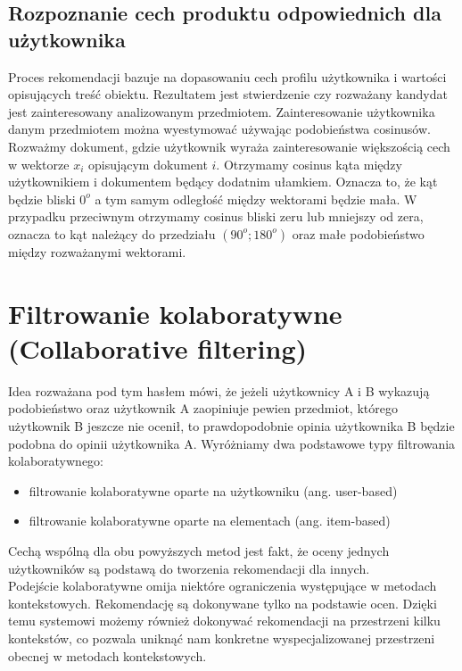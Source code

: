 \documentclass[12pt,a4paper]{report}
\begin{document}
\subsection{Rozpoznanie cech produktu odpowiednich dla użytkownika} 
Proces rekomendacji bazuje na dopasowaniu cech profilu użytkownika i wartości opisujących treść obiektu. Rezultatem jest stwierdzenie czy rozważany kandydat jest zainteresowany analizowanym przedmiotem. Zainteresowanie użytkownika danym przedmiotem można wyestymować używając podobieństwa cosinusów. Rozważmy dokument, gdzie użytkownik wyraża zainteresowanie większością cech w wektorze $x_i$ opisującym dokument $i$. Otrzymamy cosinus kąta między użytkownikiem i dokumentem będący dodatnim ułamkiem. Oznacza to, że kąt będzie bliski $0^{o}$ a tym samym odległość między wektorami będzie mała. W przypadku przeciwnym otrzymamy cosinus bliski zeru lub mniejszy od zera, oznacza to kąt należący do przedziału $(90^{o};180^{o})$ oraz małe podobieństwo między rozważanymi wektorami.




\section{Filtrowanie kolaboratywne (Collaborative filtering)}

Idea rozważana pod tym hasłem mówi, że jeżeli użytkownicy A i B wykazują podobieństwo oraz użytkownik A zaopiniuje pewien przedmiot, którego użytkownik B jeszcze nie ocenił, to prawdopodobnie opinia użytkownika B będzie podobna do opinii użytkownika A. Wyróżniamy dwa podstawowe typy filtrowania kolaboratywnego:
\begin{itemize}
\item filtrowanie kolaboratywne oparte na użytkowniku (ang. user-based)
\item filtrowanie kolaboratywne oparte na  elementach (ang. item-based)
\end{itemize}
Cechą wspólną dla obu powyższych metod jest fakt, że oceny jednych użytkowników są podstawą do tworzenia rekomendacji dla innych. 
\\Podejście kolaboratywne omija niektóre ograniczenia występujące w metodach kontekstowych. Rekomendację są dokonywane tylko na podstawie ocen. Dzięki temu systemowi możemy również dokonywać rekomendacji na przestrzeni kilku kontekstów, co pozwala uniknąć nam konkretne wyspecjalizowanej przestrzeni obecnej w metodach kontekstowych.
\end{document}
